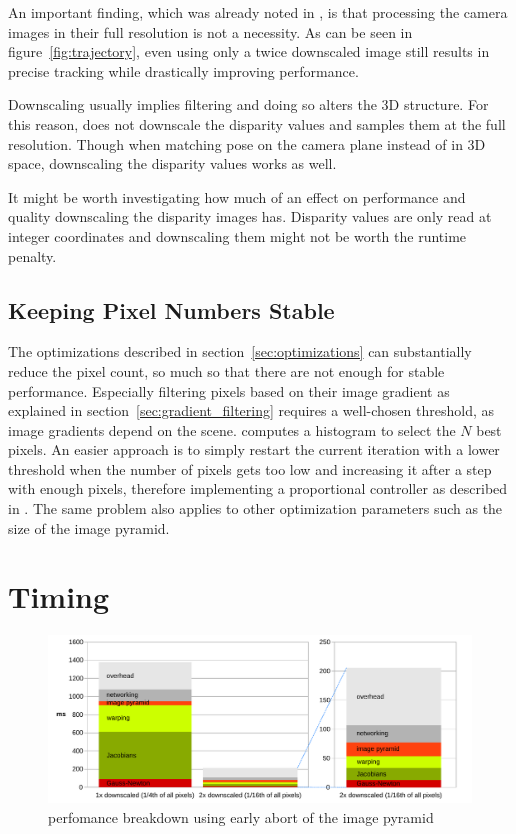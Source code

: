 An important finding, which was already noted in \cite{comport2007odometry}, is
that processing the camera images in their full resolution is not a necessity.
As can be seen in figure~\ref{fig:trajectory}, even using only a twice
downscaled image still results in precise tracking while drastically improving
performance.

Downscaling usually implies filtering and doing so alters the 3D structure. For
this reason, \cite{comport2007odometry} does not downscale the disparity values and
samples them at the full resolution. Though when matching pose on the camera plane
instead of in 3D space, downscaling the disparity values works as well.

It might be worth investigating how much of an effect on performance and
quality downscaling the disparity images has. Disparity values are only read at
integer coordinates and downscaling them might not be worth the runtime
penalty.

\subsection{Keeping Pixel Numbers Stable}

The optimizations described in section~\ref{sec:optimizations} can
substantially reduce the pixel count, so much so that there are not enough for
stable performance. Especially filtering pixels based on their image gradient
as explained in section~\ref{sec:gradient_filtering} requires a well-chosen
threshold, as image gradients depend on the scene. \cite{comport2007odometry}
computes a histogram to select the $N$ best pixels. An easier approach is to
simply restart the current iteration with a lower threshold when the number of
pixels gets too low and increasing it after a step with enough pixels,
therefore implementing a proportional controller as described in
\cite{omaridenseodometry}. The same problem also applies to other optimization
parameters such as the size of the image pyramid.

\section{Timing}
\label{sec:timing}

\begin{figure}
    \centering
    \includegraphics[width=\textwidth]{images/timing.pdf}
    \caption{perfomance breakdown using early abort of the image pyramid}
    \label{fig:timing}
\end{figure}

